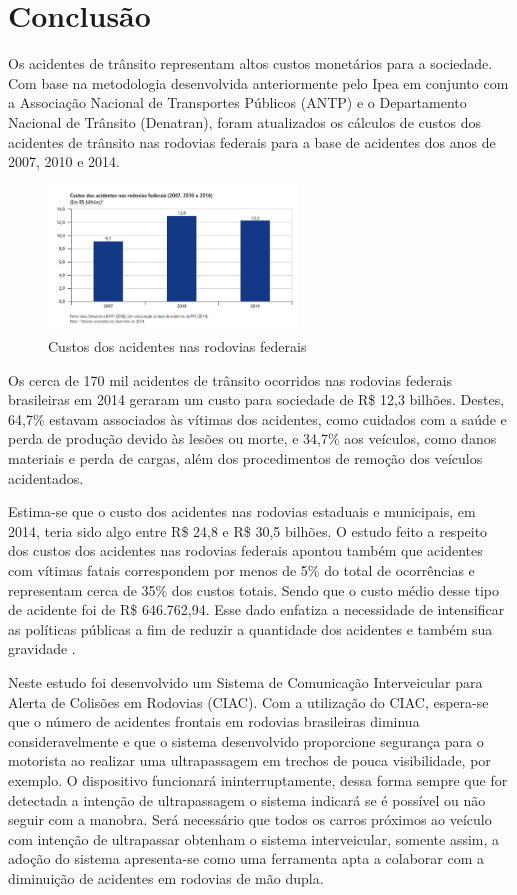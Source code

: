 \chapter{Conclusão}

Os acidentes de trânsito representam altos custos monetários para a sociedade. Com base na metodologia desenvolvida anteriormente pelo Ipea em conjunto com a Associação Nacional de Transportes Públicos (ANTP) e o Departamento Nacional de Trânsito (Denatran), foram atualizados os cálculos de custos dos acidentes de trânsito nas rodovias federais para a base de acidentes dos anos de 2007, 2010 e 2014.
\begin{figure}[h!]
  \centering
  \includegraphics[width=250px, scale=1]{figuras/custos_acidentes_rodovia}
  \caption{Custos dos acidentes nas rodovias federais}
\label{fig:custos_acidentes_rodovia}
\end{figure}

Os cerca de 170 mil acidentes de trânsito ocorridos nas rodovias federais brasileiras em 2014 geraram um custo para
sociedade de R\$ 12,3 bilhões. Destes, 64,7\% estavam associados às vítimas dos acidentes, como cuidados com a saúde e
perda de produção devido às lesões ou morte, e 34,7\% aos veículos, como danos materiais e perda de cargas, além dos
procedimentos de remoção dos veículos acidentados.

Estima-se que o custo dos acidentes nas rodovias estaduais e municipais, em 2014, teria sido algo entre R\$ 24,8 e R\$ 30,5
bilhões. O estudo feito a respeito dos custos dos acidentes nas rodovias federais apontou também que acidentes com
vítimas fatais correspondem por menos de 5\% do total de ocorrências e representam cerca de 35\% dos custos totais.
Sendo que o custo médio desse tipo de acidente foi de R\$ 646.762,94. Esse dado enfatiza a necessidade de intensificar
as políticas públicas a fim de reduzir a quantidade dos acidentes e também sua gravidade \cite{ipea4}.

Neste estudo foi desenvolvido um Sistema de Comunicação Interveicular para Alerta de Colisões em Rodovias (CIAC). Com a utilização do CIAC, espera-se que o número de acidentes frontais em rodovias brasileiras diminua consideravelmente e que o sistema desenvolvido proporcione segurança para o motorista ao realizar uma ultrapassagem em trechos de pouca visibilidade, por exemplo. O dispositivo funcionará ininterruptamente, dessa forma sempre que for detectada a intenção de ultrapassagem o sistema indicará se é possível ou não seguir com a manobra. Será necessário que todos os carros próximos ao veículo com intenção de ultrapassar obtenham o sistema interveicular, somente assim, a adoção do sistema apresenta-se como uma ferramenta apta a colaborar com a diminuição de acidentes em rodovias de mão dupla.

